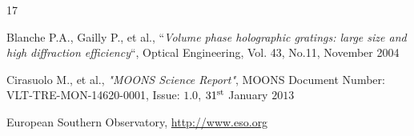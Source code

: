 \documentclass[english, Lau, oneside]{sapthesis}%
\begin{document}
\backmatter
{}
\begin{thebibliography}{17}

Blanche P.A., Gailly P., et al., “\textit{Volume phase holographic gratings: large size and high diffraction efficiency}“, Optical Engineering, Vol. 43, No.11, November 2004

Cirasuolo M., et al., \textit{"MOONS Science Report"}, MOONS Document Number: VLT-TRE-MON-14620-0001, Issue: $1.0$, $31^{\textup{st}}$ January $2013$

European Southern Observatory, \url{http://www.eso.org}

\end{thebibliography}
\end{document}
